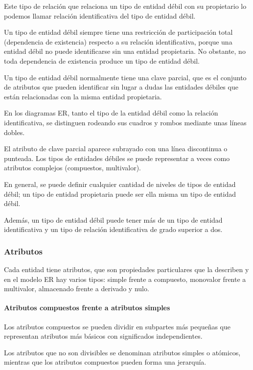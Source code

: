 Este tipo de relación que relaciona un tipo de entidad débil con su propietario lo podemos llamar relación identificativa del tipo de entidad débil. 


Un tipo de entidad débil siempre tiene una restricción de participación total (dependencia de existencia) respecto a su relación identificativa, porque una entidad débil no puede identificarse sin una entidad propietaria. No obstante, no toda dependencia de existencia produce un tipo de entidad débil.


Un tipo de entidad débil normalmente tiene una clave parcial, que es el conjunto de atributos que pueden identificar sin lugar a dudas las entidades débiles que están relacionadas con la misma entidad propietaria. 


En los diagramas ER, tanto el tipo de la entidad débil como la relación identificativa, se distinguen rodeando sus cuadros y rombos mediante unas líneas dobles.


El atributo de clave parcial aparece subrayado con una línea discontinua o punteada. Los tipos de entidades débiles se puede representar a veces como atributos complejos (compuestos, multivalor). 


En general, se puede definir cualquier cantidad de niveles de tipos de entidad débil; un tipo de entidad propietaria puede ser ella misma un tipo de entidad débil. 


Además, un tipo de entidad débil puede tener más de un tipo de entidad identificativa y un tipo de relación identificativa de grado superior a dos.

\subsubsection{Atributos}
Cada entidad tiene atributos, que son propiedades particulares que la describen y en el modelo ER hay varios tipos: simple frente a compuesto, monovalor frente a multivalor, almacenado frente a derivado y nulo.


\paragraph*{Atributos compuestos frente a atributos simples} Los atributos compuestos se pueden dividir en subpartes más pequeñas que representan atributos más básicos con significados independientes.


Los atributos que no son divisibles se denominan atributos simples o atómicos, mientras que los atributos compuestos pueden forma una jerarquía. 


